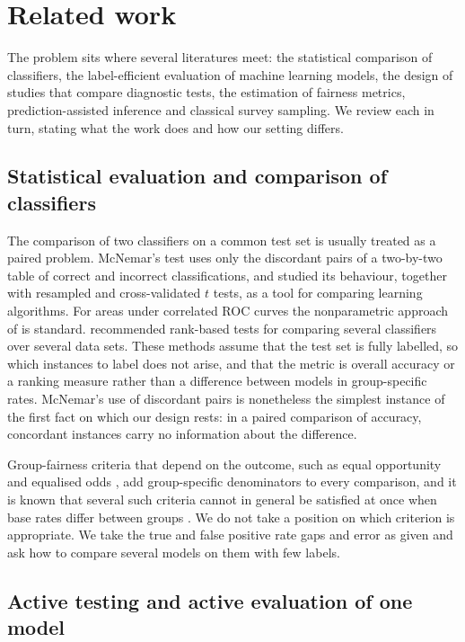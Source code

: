 \documentclass[pdflatex,sn-mathphys-num,iicol]{sn-jnl}
\theoremstyle{thmstyleone}
\theoremstyle{thmstyletwo}
\theoremstyle{thmstylethree}
\begin{document}
\section{Related work}\label{sec:related}

The problem sits where several literatures meet: the statistical comparison of classifiers, the label-efficient evaluation of machine learning models, the design of studies that compare diagnostic tests, the estimation of fairness metrics, prediction-assisted inference and classical survey sampling. We review each in turn, stating what the work does and how our setting differs.

\subsection{Statistical evaluation and comparison of classifiers}

The comparison of two classifiers on a common test set is usually treated as a paired problem. McNemar's test \citep{mcnemar1947} uses only the discordant pairs of a two-by-two table of correct and incorrect classifications, and \citet{dietterich1998} studied its behaviour, together with resampled and cross-validated $t$ tests, as a tool for comparing learning algorithms. For areas under correlated ROC curves the nonparametric approach of \citet{delong1988} is standard. \citet{demsar2006} recommended rank-based tests for comparing several classifiers over several data sets. These methods assume that the test set is fully labelled, so which instances to label does not arise, and that the metric is overall accuracy or a ranking measure rather than a difference between models in group-specific rates. McNemar's use of discordant pairs is nonetheless the simplest instance of the first fact on which our design rests: in a paired comparison of accuracy, concordant instances carry no information about the difference.

Group-fairness criteria that depend on the outcome, such as equal opportunity and equalised odds \citep{hardt2016}, add group-specific denominators to every comparison, and it is known that several such criteria cannot in general be satisfied at once when base rates differ between groups \citep{chouldechova2017}. We do not take a position on which criterion is appropriate. We take the true and false positive rate gaps and error as given and ask how to compare several models on them with few labels.

\subsection{Active testing and active evaluation of one model}
\end{document}
